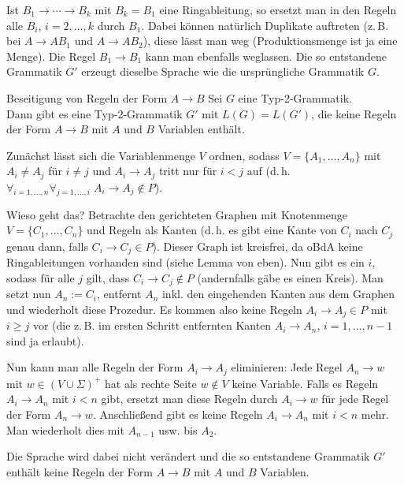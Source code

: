 \begin{Beweis}
    Ist $B_1 \rightarrow \dotsb \rightarrow B_k$ mit $B_k = B_1$ eine
    Ringableitung, so ersetzt man in den Regeln
    alle $B_i$, $i = 2, \dotsc, k$ durch $B_1$.
    Dabei können natürlich Duplikate auftreten
    (z.\,B. bei $A \rightarrow AB_1$ und $A \rightarrow AB_2$),
    diese lässt man weg (Produktionsmenge ist ja eine Menge).
    Die Regel $B_1 \rightarrow B_1$ kann man ebenfalls weglassen.
    Die so entstandene Grammatik $G'$ erzeugt dieselbe Sprache wie die
    ursprüngliche Grammatik $G$.
\end{Beweis}

\begin{Lemma}{Beseitigung von Regeln der Form $A \rightarrow B$}
    Sei $G$ eine Typ-2-Grammatik.\\
    Dann gibt es eine Typ-2-Grammatik $G'$ mit $L(G) = L(G')$, die keine
    Regeln der Form $A \rightarrow B$ mit $A$ und $B$ Variablen enthält.
\end{Lemma}

\begin{Beweis}
    Zunächst lässt sich die Variablenmenge $V$ ordnen, sodass
    $V = \{A_1, \dotsc, A_n\}$ mit $A_i \not= A_j$ für $i \not= j$ und
    $A_i \rightarrow A_j$ tritt nur für $i < j$ auf
    (d.\,h. $\forall_{i=1,\dots,n} \forall_{j=1,\dotsc,i}\;
    A_i \rightarrow A_j \notin P$).

    Wieso geht das?
    Betrachte den gerichteten Graphen mit Knotenmenge
    $V = \{C_1, \dotsc, C_n\}$ und Regeln
    als Kanten (d.\,h. es gibt eine Kante von
    $C_i$ nach $C_j$ genau dann, falls $C_i \rightarrow C_j \in P$).
    Dieser Graph ist kreisfrei, da oBdA keine Ringableitungen vorhanden sind
    (siehe Lemma von eben).
    Nun gibt es ein $i$, sodass für alle $j$ gilt, dass
    $C_i \rightarrow C_j \notin P$
    (andernfalls gäbe es einen Kreis).
    Man setzt nun $A_n := C_i$, entfernt $A_n$ inkl. den eingehenden Kanten
    aus dem Graphen und wiederholt diese Prozedur.
    Es kommen also keine Regeln $A_i \rightarrow A_j \in P$ mit
    $i \ge j$ vor
    (die z.\,B. im ersten Schritt entfernten Kanten
    $A_i \rightarrow A_n$, $i = 1, \dotsc, n - 1$ sind ja erlaubt).

    Nun kann man alle Regeln der Form $A_i \rightarrow A_j$ eliminieren:
    Jede Regel $A_n \rightarrow w$ mit $w \in (V \cup \Sigma)^+$ hat als
    rechte Seite $w \notin V$ keine Variable.
    Falls es Regeln $A_i \rightarrow A_n$ mit $i < n$ gibt, ersetzt man diese
    Regeln durch $A_i \rightarrow w$ für jede Regel der Form
    $A_n \rightarrow w$.
    Anschließend gibt es keine Regeln $A_i \rightarrow A_n$ mit $i < n$ mehr.
    Man wiederholt dies mit $A_{n-1}$ usw. bis $A_2$.

    Die Sprache wird dabei nicht verändert und die so entstandene
    Grammatik $G'$ enthält keine Regeln der Form $A \rightarrow B$ mit
    $A$ und $B$ Variablen.
\end{Beweis}

